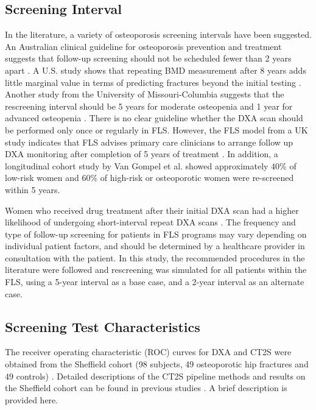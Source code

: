 \subsection{Screening Interval}

In the literature, a variety of osteoporosis screening intervals have been suggested. An Australian clinical guideline for osteoporosis prevention and treatment suggests that follow-up screening should not be scheduled fewer than 2 years apart \cite{4-15}. A U.S. study shows that repeating BMD measurement after 8 years adds little marginal value in terms of predicting fractures beyond the initial testing \cite{4-16}. Another study from the University of Missouri-Columbia suggests that the rescreening interval should be 5 years for moderate osteopenia and 1 year for advanced osteopenia \cite{4-17}. There is no clear guideline whether the DXA scan should be performed only once or regularly in FLS.  However, the FLS model from a UK study indicates that FLS advises primary care clinicians to arrange follow up DXA monitoring after completion of 5 years of treatment \cite{4-18}. In addition, a longitudinal cohort study by Van Gompel et al. \cite{4-19} showed approximately 40\% of low-risk women and 60\% of high-risk or osteoporotic women were re-screened within 5 years. 

Women who received drug treatment after their initial DXA scan had a higher likelihood of undergoing short-interval repeat DXA scans \cite{4-19}. The frequency and type of follow-up screening for patients in FLS programs may vary depending on individual patient factors, and should be determined by a healthcare provider in consultation with the patient. In this study, the recommended procedures in the literature were followed and rescreening was simulated for all patients within the FLS, using a 5-year interval as a base case, and a 2-year interval as an alternate case.

\subsection{Screening Test Characteristics}

The receiver operating characteristic (ROC) curves for DXA and CT2S were obtained from the Sheffield cohort (98 subjects, 49 osteoporotic hip fractures and 49 controls) \cite{4-6}. Detailed descriptions of the CT2S pipeline methods and results on the Sheffield cohort can be found in previous studies \cite{4-3,4-6,4-7}. A brief description is provided here.

